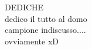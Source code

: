 \thispagestyle{empty}
{}

\vspace*{3cm}
\begin{center}
	DEDICHE \\ \medskip
	dedico il tutto al domo \\
	campione indiscusso....\\
	 ovviamente xD
\end{center}